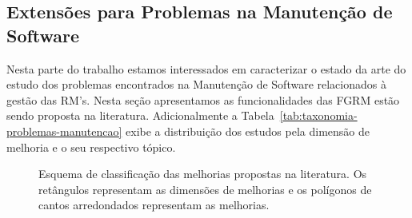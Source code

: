 \subsection{Extensões para Problemas na Manutenção de Software}
\label{sub:extensões_para_problemas_na_manutenção_de_software}

Nesta parte do trabalho estamos interessados em caracterizar o estado da arte do
estudo dos problemas encontrados na Manutenção de Software relacionados à gestão
das RM's. Nesta seção apresentamos as funcionalidades das FGRM estão sendo
proposta na literatura. Adicionalmente a
Tabela~\ref{tab:taxonomia-problemas-manutencao} exibe a distribuição dos estudos
pela dimensão de melhoria e o seu respectivo tópico.



\begin{figure}[tb] \centering
	\caption{Esquema de classificação das melhorias propostas na literatura. Os
		retângulos representam as dimensões de melhorias e os polígonos de
		cantos arredondados representam as melhorias.}
	\label{fig:diagrama-esquema-dimensao-melhorias} \end{figure}

